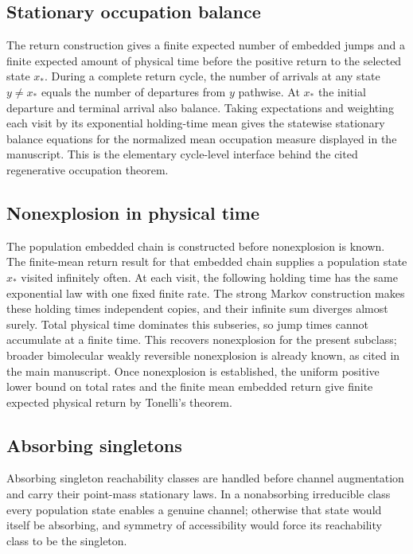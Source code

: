 \documentclass[10pt]{article}
\begin{document}
\subsection{Stationary occupation balance}

The return construction gives a finite expected number of embedded jumps and
a finite expected amount of physical time before the positive return to the
selected state $x_*$.  During a complete return cycle, the number of arrivals
at any state $y\ne x_*$ equals the number of departures from $y$ pathwise.  At
$x_*$ the initial departure and terminal arrival also balance.  Taking
expectations and weighting each visit by its exponential holding-time mean
gives the statewise stationary balance equations for the normalized mean
occupation measure displayed in the manuscript.  This is the elementary
cycle-level interface behind the cited regenerative occupation theorem.

\subsection{Nonexplosion in physical time}

The population embedded chain is constructed before nonexplosion is known.
The finite-mean return result for that embedded chain supplies a population
state $x_*$ visited infinitely often.  At each visit, the following holding time has the same exponential law
with one fixed finite rate.  The strong Markov construction makes these
holding times independent copies, and their infinite sum diverges almost
surely.  Total physical time dominates this subseries, so jump times cannot
accumulate at a finite time.  This recovers nonexplosion for the present
subclass; broader bimolecular weakly reversible nonexplosion is already known,
as cited in the main manuscript.  Once nonexplosion is established, the
uniform positive lower bound on total rates and the finite mean embedded return
give finite expected physical return by Tonelli's theorem.

\subsection{Absorbing singletons}

Absorbing singleton reachability classes are handled before channel
augmentation and carry their point-mass stationary laws.  In a nonabsorbing
irreducible class every population state enables a genuine channel; otherwise
that state would itself be absorbing, and symmetry of accessibility would
force its reachability class to be the singleton.
\end{document}
